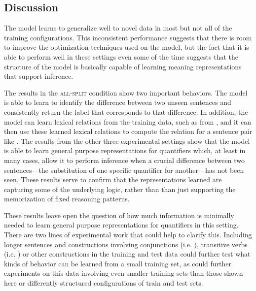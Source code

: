 
\subsection{Discussion} 


The model learns to generalize well to novel data in most but not all of the training configurations. This inconsistent performance suggests that there is room to improve the optimization techniques used on the model, but the fact that it is able to perform well in these settings even some of the time suggests that the structure of the model is basically capable of learning meaning representations that support inference.

The results in the \textsc{all-split} condition show two important behaviors. The model is able to learn to identify the difference between two unseen sentences and consistently return the label that corresponds to that difference. In addition, the model can learn lexical relations from the training data, such as  from , and it can then use these learned lexical relations to compute the relation for a sentence pair like . The results from the other three experimental settings show that the model is able to learn general purpose representations for quantifiers which, at least in many cases, allow it to perform inference when a crucial difference between two sentences---the  substitution of one specific quantifier for another---has not been seen. These results serve to confirm that the representations learned are capturing some of the underlying logic, rather than than just supporting the memorization of fixed reasoning patterns. 


These results leave open the question of how much information is minimally needed to learn general purpose representations for quantifiers in this setting. There are two lines of experimental work that could help to clarify this. Including longer sentences and constructions involving conjunctions (i.e. ), transitive verbs (i.e. ) or other constructions in the training and test data could further test what kinds of behavior can be learned from a small training set, as could further experiments on this data involving even smaller training sets than those shown here or differently structured configurations of train and test sets.

